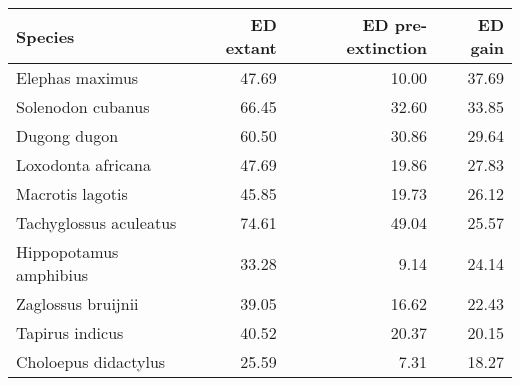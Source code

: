 \begin{table}[ht]
\centering
\begin{tabular}{lrrr}
  \hline
Species & ED extant & ED pre-extinction & ED gain \\ 
  \hline
Elephas maximus & 47.69 & 10.00 & 37.69 \\ 
  Solenodon cubanus & 66.45 & 32.60 & 33.85 \\ 
  Dugong dugon & 60.50 & 30.86 & 29.64 \\ 
  Loxodonta africana & 47.69 & 19.86 & 27.83 \\ 
  Macrotis lagotis & 45.85 & 19.73 & 26.12 \\ 
  Tachyglossus aculeatus & 74.61 & 49.04 & 25.57 \\ 
  Hippopotamus amphibius & 33.28 & 9.14 & 24.14 \\ 
  Zaglossus bruijnii & 39.05 & 16.62 & 22.43 \\ 
  Tapirus indicus & 40.52 & 20.37 & 20.15 \\ 
  Choloepus didactylus & 25.59 & 7.31 & 18.27 \\ 
   \hline
\end{tabular}
\end{table}
